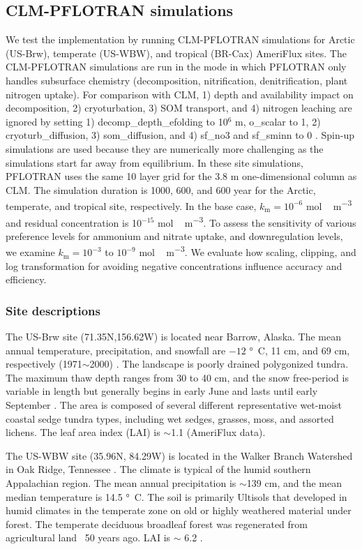 \documentclass[gmd, manuscript]{copernicus}
\begin{document}
\subsection{CLM-PFLOTRAN simulations}
We test the implementation by running CLM-PFLOTRAN simulations for Arctic
(US-Brw), temperate (US-WBW), and tropical (BR-Cax) AmeriFlux sites. The
CLM-PFLOTRAN simulations are run in the mode in which PFLOTRAN only handles
subsurface chemistry (decomposition, nitrification, denitrification, plant
nitrogen uptake). For comparison with CLM, 1) depth and  availability
impact on decomposition, 2) cryoturbation, 3) SOM transport, and 4) nitrogen
leaching are ignored by setting 1) decomp\_depth\_efolding to 10$^6$ m,
o\_scalar to 1, 2) cryoturb\_diffusion, 3) som\_diffusion, and 4) sf\_no3 and
sf\_sminn to 0 \citep{Oleson2013}. Spin-up simulations are used because they are numerically more
challenging  as the simulations start far away from equilibrium. In these
site simulations, PFLOTRAN uses the same 10 layer grid for the 3.8 m
one-dimensional column as CLM. The simulation duration is 1000, 600, and 600
year for the Arctic, temperate, and tropical site, respectively.
In the base case, $k_\text{m}=10^{-6}$ \unit{mol\,m^{-3}} and
residual concentration is 10$^{-15}$ \unit{mol\,m^{-3}}. To assess the sensitivity
of various preference levels for ammonium and nitrate uptake, and
downregulation levels, we examine  $k_\text{m}=10^{-3}$ to $10^{-9}$
\unit{mol\,m^{-3}}. We evaluate how scaling, clipping, and log transformation for
avoiding negative concentrations influence accuracy and efficiency.

\subsubsection{Site descriptions}
The US-Brw site (71.35N,156.62W) is located near Barrow, Alaska. The mean annual
temperature, precipitation, and snowfall are $-12$ \unit{\degree C}, 11 cm, and
69 cm, respectively (1971$\sim$2000) \citep{Lara2012}. The landscape is poorly
drained polygonized tundra. The maximum thaw depth ranges from 30 to 40 cm, and the
snow free-period is variable in length but generally begins in early June and
lasts until early September \citep{Hinkel2003}. The area is composed of several
different representative wet-moist coastal sedge tundra types, including wet
sedges, grasses, moss, and assorted lichens. The leaf area index (LAI) is
$\sim$1.1 (AmeriFlux data).

The US-WBW site (35.96N, 84.29W) is located in the Walker Branch Watershed in
Oak Ridge, Tennessee \citep{Hanson2003}. The climate is typical of the humid
southern Appalachian region. The mean annual precipitation is $\sim$139 cm, and
the mean median temperature is 14.5 \unit{\degree C}.  
The soil is primarily Ultisols that developed in humid climates in the
temperate zone on old or highly weathered material under forest. The temperate
deciduous broadleaf forest was regenerated from agricultural land ~50 years ago.
LAI is $\sim$ 6.2 \citep{Hanson2004}.
\end{document}
